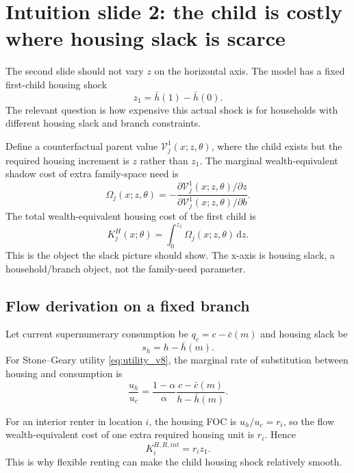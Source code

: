\documentclass[11pt]{article}
\newcommand{\mc}{\mathcal}
\newcommand{\dd}{\mathrm d}
\newcommand{\slack}{s}
\theoremstyle{remark}
\begin{document}
\section{Intuition slide 2: the child is costly where housing slack is scarce}

The second slide should not vary \(z\) on the horizontal axis.  The model has a fixed first-child housing shock
\begin{equation}
  z_1=\bar h(1)-\bar h(0).
\end{equation}
The relevant question is how expensive this actual shock is for households with different housing slack and branch constraints.

Define a counterfactual parent value \(\mc V^1_j(x;z,\theta)\), where the child exists but the required housing increment is \(z\) rather than \(z_1\).  The marginal wealth-equivalent shadow cost of extra family-space need is
\begin{equation}
  \Omega_j(x;z,\theta)
  =-
  \frac{\partial \mc V^1_j(x;z,\theta)/\partial z}
       {\partial \mc V^1_j(x;z,\theta)/\partial b}.
  \label{eq:Omega_v8}
\end{equation}
The total wealth-equivalent housing cost of the first child is
\begin{equation}
  K^H_j(x;\theta)
  =\int_0^{z_1}\Omega_j(x;z,\theta)\,\dd z.
  \label{eq:KH_v8}
\end{equation}
This is the object the slack picture should show.  The x-axis is housing slack, a household/branch object, not the family-need parameter.

\subsection*{Flow derivation on a fixed branch}

Let current supernumerary consumption be \(q_c=c-\bar c(m)\) and housing slack be
\begin{equation}
  \slack_h=h-\bar h(m).
\end{equation}
For Stone--Geary utility \eqref{eq:utility_v8}, the marginal rate of substitution between housing and consumption is
\begin{equation}
  \frac{u_h}{u_c}
  =\frac{1-\alpha}{\alpha}\frac{c-\bar c(m)}{h-\bar h(m)}.
  \label{eq:mrs_v8}
\end{equation}

For an interior renter in location \(i\), the housing FOC is \(u_h/u_c=r_i\), so the flow wealth-equivalent cost of one extra required housing unit is \(r_i\).  Hence
\begin{equation}
  K^{H,R,int}_i=r_i z_1.
  \label{eq:KH_rent_v8}
\end{equation}
This is why flexible renting can make the child housing shock relatively smooth.
\end{document}
